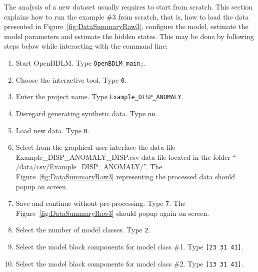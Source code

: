 The analysis of a new dataset usually requires to start from scratch.
This section explains how to run the example \#3 from scratch, that is, how to load the data presented in Figure~\ref{fig:DataSummaryRaw3}, configure the model, estimate the model parameters and estimate the hidden states.
This may be done by following steps below while interacting with the \MATLAB{} command line:
\begin{enumerate}
\item Start OpenBDLM. Type \colorbox{light-gray}{\lstinline[basicstyle = \mlttfamily \small, backgroundcolor = \color{light-gray}]!OpenBDLM_main;!}.
\item Choose the interactive tool. Type \colorbox{light-gray}{\lstinline[basicstyle = \mlttfamily \small, backgroundcolor = \color{light-gray}]!0!}.
\item Enter the project name. Type \colorbox{light-gray}{\lstinline[basicstyle = \mlttfamily \small, backgroundcolor = \color{light-gray}]!Example_DISP_ANOMALY!}. 
\item Disregard generating synthetic data. Type \colorbox{light-gray}{\lstinline[basicstyle = \mlttfamily \small, backgroundcolor = \color{light-gray}]!no!}. 
\item Load new data. Type \colorbox{light-gray}{\lstinline[basicstyle = \mlttfamily \small, backgroundcolor = \color{light-gray}]!0!}.
\item Select from the graphical user interface the data file Example\_DISP\_ANOMALY\_DISP.csv data file located in the folder `` /data/csv/Example\_DISP\_ANOMALY/''. The Figure~\ref{fig:DataSummaryRaw3} representing the processed data should popup on screen.
\item Save and continue without pre-processing. Type \colorbox{light-gray}{\lstinline[basicstyle = \mlttfamily \small, backgroundcolor = \color{light-gray}]!7!}. The Figure~\ref{fig:DataSummaryRaw3} should popup again on screen.
\item Select the number of model classes. Type \colorbox{light-gray}{\lstinline[basicstyle = \mlttfamily \small, backgroundcolor = \color{light-gray}]!2!}. 
\item Select the model block components for model class \#1. Type \colorbox{light-gray}{\lstinline[basicstyle = \mlttfamily \small, backgroundcolor = \color{light-gray}]![23 31 41]!}.
\item Select the model block components for model class \#2. Type \colorbox{light-gray}{\lstinline[basicstyle = \mlttfamily \small, backgroundcolor = \color{light-gray}]![13 31 41]!}.

\end{enumerate}
